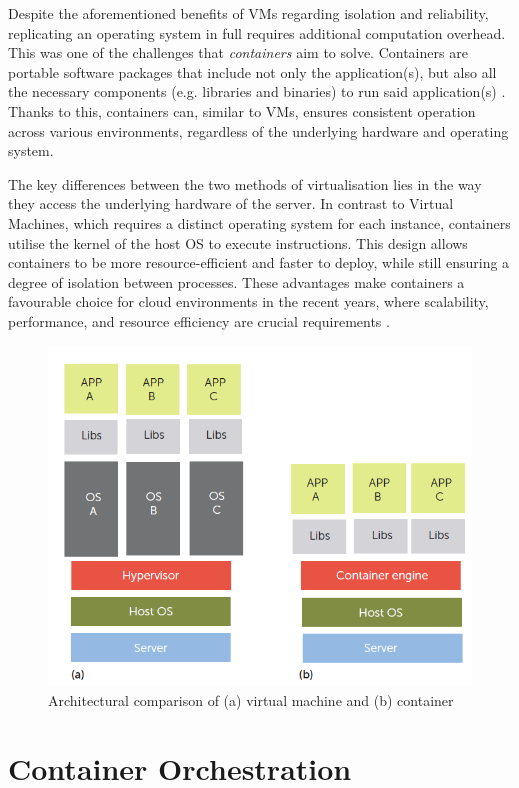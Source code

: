 Despite the aforementioned benefits of VMs regarding isolation and reliability, replicating an operating system in full requires additional computation overhead. This was one of the challenges that \textit{containers} aim to solve. Containers are portable software packages that include not only the application(s), but also all the necessary components (e.g. libraries and binaries) to run said application(s) \cite{bernsteinContainersCloudLXC2014}. Thanks to this, containers can, similar to VMs, ensures consistent operation across various environments, regardless of the underlying hardware and operating system.

The key differences between the two methods of virtualisation lies in the way they access the underlying hardware of the server. In contrast to Virtual Machines, which requires a distinct operating system for each instance, containers utilise the kernel of the host OS to execute instructions. This design allows containers to be more resource-efficient and faster to deploy, while still ensuring a degree of isolation between processes. These advantages make containers a favourable choice for cloud environments in the recent years, where scalability, performance, and resource efficiency are crucial requirements \cite{bernsteinContainersCloudLXC2014, felterUpdatedPerformanceComparison2015}.

\begin{figure}
    \centering
    \includegraphics[width=0.7\linewidth]{resources/eea3da004befcc5437960cbc868be634.png}
    \caption{Architectural comparison of (a) virtual machine and (b) container \cite{bernsteinContainersCloudLXC2014}}
    \label{fig:vms-vs-containers}
\end{figure}

\section{Container Orchestration}

